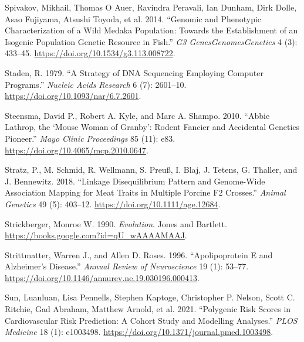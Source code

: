 \documentclass[
]{book}
\newlength{\cslhangindent}
\newlength{\cslentryspacingunit} %
\newenvironment{CSLReferences}[2] %
 {%
  \setlength{\parindent}{0pt}
  \ifodd #1
  \let\oldpar\par
  \def\par{\hangindent=\cslhangindent\oldpar}
  \fi
  \setlength{\parskip}{#2\cslentryspacingunit}
 }%
 {}
\begin{document}
\begin{CSLReferences}{1}{0}
\leavevmode{}%
Spivakov, Mikhail, Thomas O Auer, Ravindra Peravali, Ian Dunham, Dirk Dolle, Asao Fujiyama, Atsushi Toyoda, et al. 2014. {``Genomic and {Phenotypic Characterization} of a {Wild Medaka Population}: {Towards} the {Establishment} of an {Isogenic Population Genetic Resource} in {Fish}.''} \emph{G3 Genes\textbar Genomes\textbar Genetics} 4 (3): 433--45. \url{https://doi.org/10.1534/g3.113.008722}.

\leavevmode{}%
Staden, R. 1979. {``A Strategy of {DNA} Sequencing Employing Computer Programs.''} \emph{Nucleic Acids Research} 6 (7): 2601--10. \url{https://doi.org/10.1093/nar/6.7.2601}.

\leavevmode{}%
Steensma, David P., Robert A. Kyle, and Marc A. Shampo. 2010. {``Abbie {Lathrop}, the {`{Mouse Woman} of {Granby}'}: {Rodent Fancier} and {Accidental Genetics Pioneer}.''} \emph{Mayo Clinic Proceedings} 85 (11): e83. \url{https://doi.org/10.4065/mcp.2010.0647}.

\leavevmode{}%
Stratz, P., M. Schmid, R. Wellmann, S. Preuß, I. Blaj, J. Tetens, G. Thaller, and J. Bennewitz. 2018. {``Linkage Disequilibrium Pattern and Genome-Wide Association Mapping for Meat Traits in Multiple Porcine {F2} Crosses.''} \emph{Animal Genetics} 49 (5): 403--12. \url{https://doi.org/10.1111/age.12684}.

\leavevmode{}%
Strickberger, Monroe W. 1990. \emph{Evolution}. {Jones and Bartlett}. \url{https://books.google.com?id=qU_wAAAAMAAJ}.

\leavevmode{}%
Strittmatter, Warren J., and Allen D. Roses. 1996. {``Apolipoprotein {E} and {Alzheimer}'s {Disease}.''} \emph{Annual Review of Neuroscience} 19 (1): 53--77. \url{https://doi.org/10.1146/annurev.ne.19.030196.000413}.

\leavevmode{}%
Sun, Luanluan, Lisa Pennells, Stephen Kaptoge, Christopher P. Nelson, Scott C. Ritchie, Gad Abraham, Matthew Arnold, et al. 2021. {``Polygenic Risk Scores in Cardiovascular Risk Prediction: {A} Cohort Study and Modelling Analyses.''} \emph{PLOS Medicine} 18 (1): e1003498. \url{https://doi.org/10.1371/journal.pmed.1003498}.


\end{CSLReferences}
\end{document}
